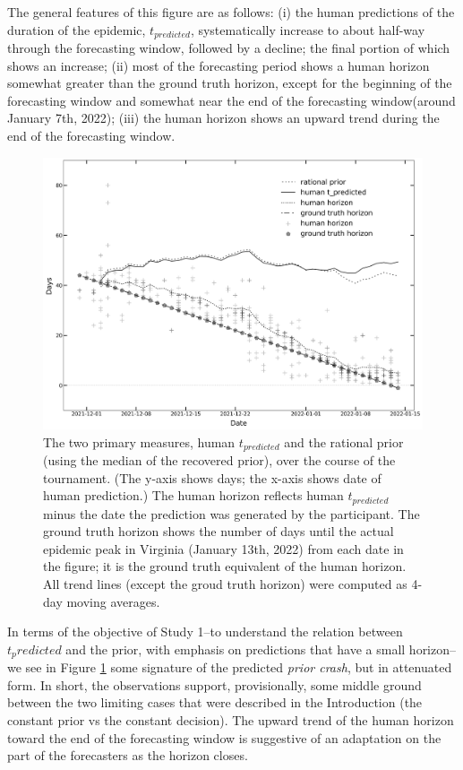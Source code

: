 \documentclass[a4paper,man,natbib]{apa6}
\begin{document}
The general features of this figure are as follows: (i) the human predictions of the duration of the epidemic, $t_{predicted}$, systematically increase to about half-way through the forecasting window, followed by a decline; the final portion of which shows an increase; (ii) most of the forecasting period shows a human horizon somewhat greater than the ground truth horizon, except for the beginning of the forecasting window and somewhat near the end of the forecasting window(around January 7th, 2022); (iii) the human horizon shows an upward trend during the end of the forecasting window.

\begin{figure}
    \centering
    \includegraphics[width=\linewidth]{Figures/Good_all_s.png}
    \caption{The two primary measures, human $t_{predicted}$ and the rational prior (using the median of the recovered prior), over the course of the tournament. (The y-axis shows days; the x-axis shows date of human prediction.)  The human horizon reflects human $t_{predicted}$ minus the date the prediction was generated by the participant.  The ground truth horizon shows the number of days until the actual epidemic peak in Virginia (January 13th, 2022) from each date in the figure; it is the ground truth equivalent of the human horizon.  All trend lines (except the groud truth horizon) were computed as 4-day moving averages. 
    }
    \label{fig:All_Ss_t_tot}
\end{figure}

In terms of the objective of Study 1--to understand the relation between $t_predicted$ and the prior, with emphasis on predictions that have a small horizon--we see in Figure \ref{fig:All_Ss_t_tot} some signature of the predicted \textit{prior crash}, but in attenuated form.  In short, the observations support, provisionally, some middle ground between the two limiting cases that were described in the Introduction (the constant prior vs the constant decision).  The upward trend of the human horizon toward the end of the forecasting window is suggestive of an adaptation on the part of the forecasters as the horizon closes.  
\end{document}
